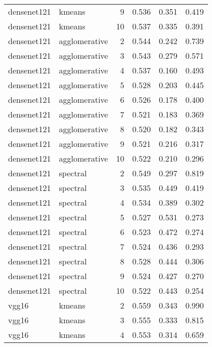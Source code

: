 \begin{longtable}{llrrrr}
densenet121 &        kmeans &  9 &            0.536 &   0.351 &    0.419 \\
densenet121 &        kmeans & 10 &            0.537 &   0.335 &    0.391 \\
densenet121 & agglomerative &  2 &            0.544 &   0.242 &    0.739 \\
densenet121 & agglomerative &  3 &            0.543 &   0.279 &    0.571 \\
densenet121 & agglomerative &  4 &            0.537 &   0.160 &    0.493 \\
densenet121 & agglomerative &  5 &            0.528 &   0.203 &    0.445 \\
densenet121 & agglomerative &  6 &            0.526 &   0.178 &    0.400 \\
densenet121 & agglomerative &  7 &            0.521 &   0.183 &    0.369 \\
densenet121 & agglomerative &  8 &            0.520 &   0.182 &    0.343 \\
densenet121 & agglomerative &  9 &            0.521 &   0.216 &    0.317 \\
densenet121 & agglomerative & 10 &            0.522 &   0.210 &    0.296 \\
densenet121 &      spectral &  2 &            0.549 &   0.297 &    0.819 \\
densenet121 &      spectral &  3 &            0.535 &   0.449 &    0.419 \\
densenet121 &      spectral &  4 &            0.534 &   0.389 &    0.302 \\
densenet121 &      spectral &  5 &            0.527 &   0.531 &    0.273 \\
densenet121 &      spectral &  6 &            0.523 &   0.472 &    0.274 \\
densenet121 &      spectral &  7 &            0.524 &   0.436 &    0.293 \\
densenet121 &      spectral &  8 &            0.528 &   0.444 &    0.306 \\
densenet121 &      spectral &  9 &            0.524 &   0.427 &    0.270 \\
densenet121 &      spectral & 10 &            0.522 &   0.443 &    0.254 \\
      vgg16 &        kmeans &  2 &            0.559 &   0.343 &    0.990 \\
      vgg16 &        kmeans &  3 &            0.555 &   0.333 &    0.815 \\
      vgg16 &        kmeans &  4 &            0.553 &   0.314 &    0.659 \\

\end{longtable}
